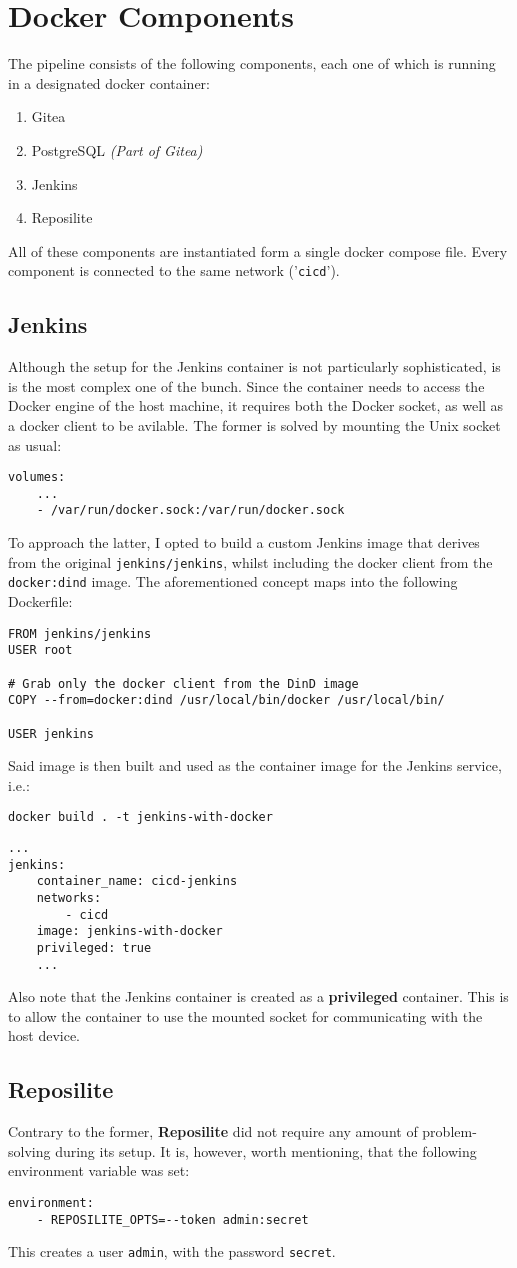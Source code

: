 \section{Docker Components}
The pipeline consists of the following components, each one of which is running in
a designated docker container:
\begin{enumerate}
	\item Gitea
	\item PostgreSQL \textit{(Part of Gitea)}
	\item Jenkins
	\item Reposilite
\end{enumerate}
All of these components are instantiated form a single docker compose file.
Every component is connected to the same network ('\verb|cicd|').
\subsection{Jenkins}
Although the setup for the Jenkins container is not particularly sophisticated,
is is the most complex one of the bunch.
Since the container needs to access the Docker engine of the host machine,
it requires both the Docker socket, as well as a docker client to be avilable.
The former is solved by mounting the Unix socket as usual:
\begin{lstlisting}
volumes:
    ...
    - /var/run/docker.sock:/var/run/docker.sock
\end{lstlisting}
To approach the latter, I opted to build a custom Jenkins image that derives from the
original \verb|jenkins/jenkins|, whilst including the docker client from the
\verb|docker:dind| image. The aforementioned concept maps into the following Dockerfile:
\begin{lstlisting}
FROM jenkins/jenkins
USER root

# Grab only the docker client from the DinD image
COPY --from=docker:dind /usr/local/bin/docker /usr/local/bin/

USER jenkins
\end{lstlisting}
Said image is then built and used as the container image for the Jenkins service, i.e.:
\begin{lstlisting}
docker build . -t jenkins-with-docker
\end{lstlisting}
\begin{lstlisting}
...
jenkins:
    container_name: cicd-jenkins
    networks:
        - cicd
    image: jenkins-with-docker
    privileged: true
    ...
\end{lstlisting}
Also note that the Jenkins container is created as a \textbf{privileged} container.
This is to allow the container to use the mounted socket for communicating with the
host device.
\subsection{Reposilite}
Contrary to the former, \textbf{Reposilite} did not require any amount of problem-solving
during its setup. It is, however, worth mentioning, that the following environment variable
was set:
\begin{lstlisting}
environment:
    - REPOSILITE_OPTS=--token admin:secret
\end{lstlisting}
This creates a user \verb|admin|, with the password \verb|secret|.
